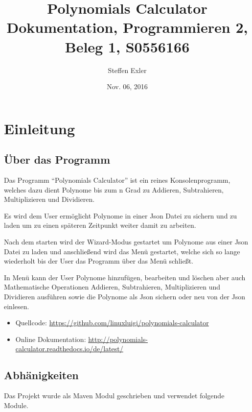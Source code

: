 \documentclass[letterpaper,10pt,ngerman]{sphinxmanual}
\title{Polynomials Calculator Dokumentation, Programmieren 2, Beleg 1, S0556166}
\date{Nov. 06, 2016}
\author{Steffen Exler}
\begin{document}
\maketitle
\tableofcontents
{}\label{index::doc}



\chapter{Einleitung}
\label{index:polynomials-calculator-doc}\label{index:einleitung}

\section{Über das Programm}
\label{intro:uber-das-programm}\label{intro::doc}
Das Programm ``Polynomials Calculator'' ist ein reines Konsolenprogramm, welches dazu dient Polynome
bis zum n Grad zu Addieren, Subtrahieren, Multiplizieren und Dividieren.

Es wird dem User ermöglicht Polynome in einer Json Datei zu sichern und zu laden um zu einen späteren
Zeitpunkt weiter damit zu arbeiten.

Nach dem starten wird der Wizard-Modus gestartet um Polynome aus einer Json Datei zu laden und anschließend
wird das Menü gestartet, welche sich so lange wiederholt bis der User das Programm über das Menü schließt.

In Menü kann der User Polynome hinzufügen, bearbeiten und löschen aber auch Mathematische Operationen
Addieren, Subtrahieren, Multiplizieren und Dividieren ausführen sowie die Polynome als Json sichern
oder neu von der Json einlesen.
\begin{itemize}
\item {} 
Quellcode: \url{https://github.com/linuxluigi/polynomials-calculator}

\item {} 
Online Dokumentation: \url{http://polynomials-calculator.readthedocs.io/de/latest/}

\end{itemize}

\noindent{}


\section{Abhänigkeiten}
\label{intro:abhanigkeiten}
Das Projekt wurde als Maven Modul geschrieben und verwendet folgende Module.
\end{document}

